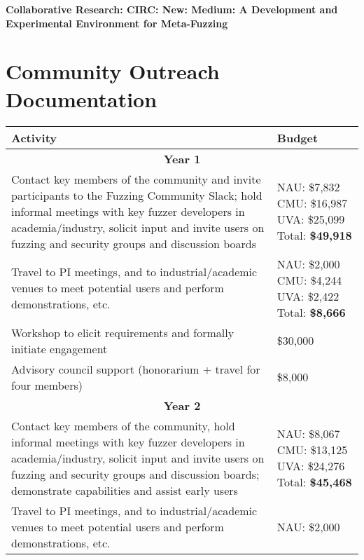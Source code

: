 \documentclass[12pt]{article}
\begin{document}
\begin{center} {\Large\sf\textbf{Collaborative Research: CIRC: New: Medium: A
      Development and Experimental Environment for Meta-Fuzzing}}
\end{center}

\section*{Community Outreach Documentation}


\begin{table}
  \begin{tabular}{|p{12cm}|p{3cm}|}
    \hline
    {\bf Activity} & {\bf Budget} \\
    \hline 
    \multicolumn{2}{c}{{\bf Year 1}} \\
    \hline
    Contact key members of the community and invite participants to the
    Fuzzing Community Slack; hold informal meetings with
    key fuzzer developers in academia/industry, solicit input and
    invite users
    on fuzzing and security groups and discussion boards &  NAU: \$7,832 CMU: \$16,987 UVA: \$25,099
                                                      Total: \textbf{\$49,918} \\
    \hline
    Travel to PI meetings, and to industrial/academic venues to meet
    potential users and perform demonstrations, etc. & NAU: \$2,000
                                                       CMU: \$4,244 UVA:
                                                       \$2,422 Total: \textbf{\$8,666}\\
    \hline
    Workshop to elicit requirements and formally initiate engagement
& \$30,000 \\
    \hline 
    Advisory council support (honorarium + travel for four members) 
  & \$8,000 \\
    \hline
    \hline
    \multicolumn{2}{c}{{\bf Year 2}} \\
    \hline
    \hline
    Contact key members of the community, hold informal meetings with
    key fuzzer developers in academia/industry, solicit input and
    invite users
    on fuzzing and security groups and discussion boards; demonstrate
    capabilities and assist early users&  NAU:  \$8,067 CMU:  \$13,125 UVA: \$24,276
                                                      Total: \textbf{\$45,468}  \\
    \hline
    Travel to PI meetings, and to industrial/academic venues to meet
    potential users and perform demonstrations, etc. & NAU: \$2,000

\end{tabular}
\end{table}
\end{document}
